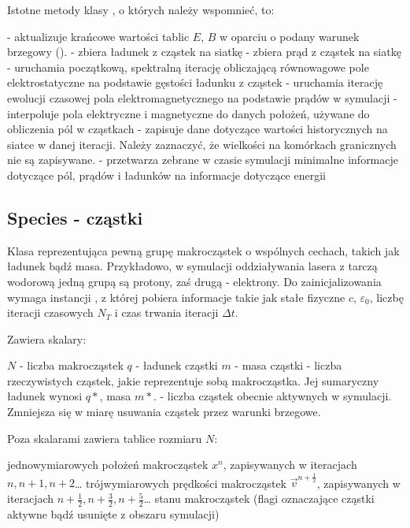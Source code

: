 Istotne metody klasy , o których należy wspomnieć, to:
\begin{itemize}
     \itemi {} - aktualizuje krańcowe wartości tablic $E$, $B$
         w oparciu o podany warunek brzegowy ().
     \itemi {} - zbiera ładunek z cząstek na siatkę
     \itemi {} - zbiera prąd z cząstek na siatkę
     \itemi {} - uruchamia początkową, spektralną iterację obliczającą równowagowe
           pole elektrostatyczne na podstawie gęstości ładunku z cząstek
     \itemi {} - uruchamia iterację ewolucji czasowej pola elektromagnetycznego na podstawie
           prądów w symulacji
     \itemi {} - interpoluje pola elektryczne i magnetyczne do danych położeń, używane
           do obliczenia pól w cząstkach
     \itemi {} - zapisuje dane dotyczące wartości historycznych na siatce w danej iteracji.
           Należy zaznaczyć, że wielkości na komórkach granicznych nie są zapisywane.
     \itemi {} - przetwarza zebrane w czasie symulacji minimalne informacje dotyczące pól, prądów i ładunków
           na informacje dotyczące energii
\end{itemize}

\subsection{Species - cząstki}
Klasa reprezentująca pewną grupę makrocząstek o wspólnych cechach, takich
jak ładunek bądź masa.  Przykładowo, w symulacji oddziaływania lasera z
tarczą wodorową jedną grupą są protony, zaś drugą - elektrony.  Do
zainicjalizowania wymaga instancji , z której pobiera informacje
takie jak stałe fizyczne $c$, $\varepsilon_0$, liczbę iteracji czasowych
$N_T$ i czas trwania iteracji $\Delta t$.

Zawiera skalary:
\begin{itemize}
    \itemi $N$ - liczba makrocząstek
    \itemi $q$ - ładunek cząstki
    \itemi $m$ - masa cząstki
    \itemi {} - liczba rzeczywistych cząstek, jakie reprezentuje
        sobą makrocząstka. Jej sumaryczny ładunek wynosi $q *
        $, masa $m * $.
    \itemi {} - liczba cząstek obecnie aktywnych w symulacji.
        Zmniejsza się w miarę usuwania cząstek przez warunki brzegowe.
\end{itemize}

Poza skalarami zawiera tablice rozmiaru $N$:
\begin{itemize}
    \itemi jednowymiarowych położeń makrocząstek $x^n$, zapisywanych w
        iteracjach $n, n+1, n+2$\ldots
    \itemi trójwymiarowych prędkości makrocząstek $\vec{v}^{n+\frac{1}{2}}$,
        zapisywanych w iteracjach $n+\frac{1}{2}, n+\frac{3}{2}, n+\frac{5}{2}$\ldots
    \itemi stanu makrocząstek (flagi oznaczające cząstki aktywne
        bądź usunięte z obszaru symulacji)
\end{itemize}

